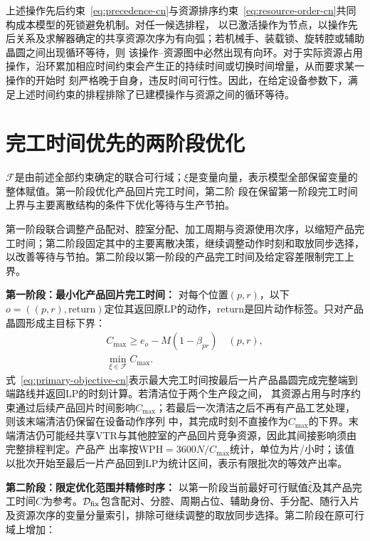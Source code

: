 上述操作先后约束~\eqref{eq:precedence-cn}与资源排序约束~\eqref{eq:resource-order-cn}共同构成本模型的死锁避免机制。对任一候选排程，
以已激活操作为节点，以操作先后关系及求解器确定的共享资源次序为有向弧；若机械手、装载锁、旋转腔或辅助晶圆之间出现循环等待，则
该操作--资源图中必然出现有向环。对于实际资源占用操作，沿环累加相应时间约束会产生正的持续时间或切换时间增量，从而要求某一操作的开始时
刻严格晚于自身，违反时间可行性。因此，在给定设备参数下，满足上述时间约束的排程排除了已建模操作与资源之间的循环等待。

\section{完工时间优先的两阶段优化}
\label{sec:model-objective-cn}

$\mathcal F$是由前述全部约束确定的联合可行域；$\xi$是变量向量，表示模型全部保留变量的整体赋值。第一阶段优化产品回片完工时间，第二阶
段在保留第一阶段完工时间上界与主要离散结构的条件下优化等待与生产节拍。

第一阶段联合调整产品配对、腔室分配、加工周期与资源使用次序，以缩短产品完工时间；第二阶段固定其中的主要离散决策，继续调整动作时刻和取放同步选择，以改善等待与节拍。第二阶段以第一阶段的产品完工时间及给定容差限制完工上界。

\noindent\textbf{第一阶段：最小化产品回片完工时间：}
对每个位置$(p,r)$，以下$o=((p,r),\mathrm{return})$定位其返回原LP的动作，$\mathrm{return}$是回片动作标签。只对产品晶圆形成主目标下界：
\begin{equation}
\begin{gathered}
C_{\max}\ge e_o-M(1-\beta_{pr})\quad(p,r),\\
\min_{\xi\in\mathcal F}C_{\max}.
\end{gathered}
\label{eq:primary-objective-cn}
\end{equation}
式~\eqref{eq:primary-objective-cn}表示最大完工时间按最后一片产品晶圆完成完整端到端路线并返回LP的时刻计算。若清洁位于两个生产段之间，
其资源占用与时序约束通过后续产品回片时间影响$C_{\max}$；若最后一次清洁之后不再有产品工艺处理，则该末端清洁仍保留在设备动作序列
中，其完成时刻不直接作为$C_{\max}$的下界。末端清洁仍可能经共享VTR与其他腔室的产品回片竞争资源，因此其间接影响须由完整排程判定。产品产
出率按$\mathrm{WPH}=3600N/C_{\max}$统计，单位为片/小时；该值以批次开始至最后一片产品回到LP为统计区间，表示有限批次的等效产出率。

\noindent\textbf{第二阶段：限定优化范围并精修时序：}
以第一阶段当前最好可行赋值$\widehat\xi$及其产品完工时间$\widehat C$为参考。$\mathcal D_{\rm fix}$包含配对、分腔、周期占位、辅助身份、手分配、随行入片及资源次序的变量分量索引，排除可继续调整的取放同步选择。第二阶段在原可行域上增加：

